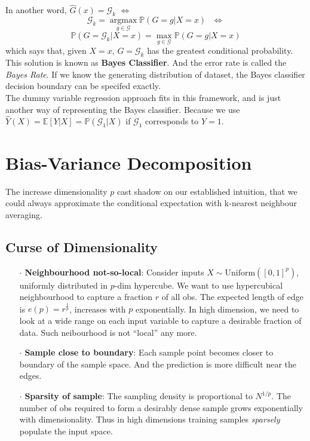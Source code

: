 \documentclass[a4paper, 11pt]{article}
\DeclareMathOperator*{\argmax}{argmax}
\begin{document}
In another word, $\hat{G}(x)=\mathcal{G}_k$ $\iff$
$$
\mathcal{G}_k = \argmax\limits_{g \in \mathcal{G}} \mathbb{P}\left(G=g|X=x\right)~~~\iff
$$
$$
\mathbb{P}\left(G=\mathcal{G}_k|X=x\right) = \max\limits_{g \in \mathcal{G}} \mathbb{P}\left(G=g|X=x\right)
$$
which says that, given $X= x$, $G=\mathcal{G}_k$ has the greatest conditional probability. This solution is known as \textbf{Bayes Classifier}. And the error rate is called the \emph{Bayes Rate}. If we know the generating distribution of dataset, the Bayes classifier decision boundary can be specifed exactly.
~\\
The dummy variable regression approach fits in this framework, and is just another way of representing the Bayes classifier. Because we use $\hat{Y}(X) = \mathbb{E}\left[Y|X\right] = \mathbb{P}\left(\mathcal{G}_1|X\right)$ if $\mathcal{G}_1$ corresponds to $Y=1$.








\section{Bias-Variance Decomposition}
The increase dimensionality $p$ cast shadow on our established intuition, that we could always approximate the conditional expectation with k-nearest neighbour averaging.
~\\
\subsection{Curse of Dimensionality}
\begin{itemize}
	\item[$\cdot$] \textbf{Neighbourhood not-so-local}: Consider inputs $X\sim \text{Uniform}([0,1]^p)$, uniformly distributed in $p$-dim hypercube. We want to use hypercubical neighbourhood to capture a fraction $r$ of all obs. The expected length of edge is $e(p) = r^{\frac{1}{p}}$, increases with $p$ exponentially. In high dimension, we need to look at a wide range on each input variable to capture a desirable fraction of data. Such neibourhood is not ``local'' any more.
	\item[$\cdot$] \textbf{Sample close to boundary}: Each sample point becomes closer to boundary of the sample space. And the prediction is more difficult near the edges. 
	\item[$\cdot$] \textbf{Sparsity of sample}: The sampling density is proportional to $N^{1/p}$. The number of obs required to form a desirably dense sample grows exponentially with dimensionality. Thus in high dimensions training samples \emph{sparsely} populate the input space.
\end{itemize}
\end{document}

